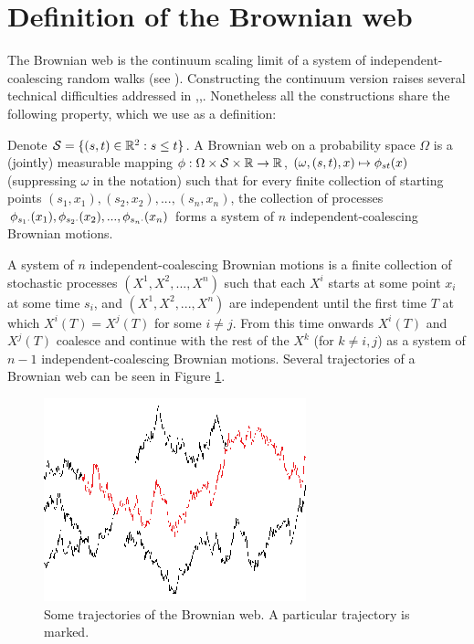 {
\section{Definition of the Brownian web}
\label{sec:brownian-web-definition}

The Brownian web is the continuum scaling limit of a system of
independent-coalescing random walks (see
\cite{tsirelson-lecture-course}).  Constructing the
continuum version raises several technical difficulties addressed in
\cite{toth-werner},\cite{fontes-et-al},\cite{norris-turner}.
Nonetheless all the
constructions share the following property, which we use as a
definition:

\newcommand{\simplex}{\mathcal{S}}

  Denote $\simplex=\{(s, t) \in \R^2 : s \le t\}$.
  A Brownian web on a probability space $\Omega$ is a (jointly)
  measurable mapping $\webnoargs : \Omega \cross \simplex \cross \R
  \to \R$, $(\omega, (s, t), x) \mapsto \phi_{{s}{t}}(x)$ (suppressing
  $\omega$ in the notation) such that for every finite collection of
  starting points $(s_1, x_1),(s_2, x_2),...,(s_n, x_n)$, the
  collection of processes $\phi_{{s_1}{\cdot}}(x_1),
  \phi_{{s_2}{\cdot}}(x_2),...,\phi_{{s_n}{\cdot}}(x_n)$
  forms a system of $n$ independent-coalescing Brownian motions.

  \newcommand{\bm}[1]{X^{#1}}

  A system of $n$ independent-coalescing Brownian motions is a finite
  collection of stochastic processes $(\bm{1}, \bm{2},...,\bm{n})$ such that
  each $\bm{i}$ starts at some point $x_i$ at some time $s_i$, and $(\bm{1},
  \bm{2},...,\bm{n})$ are independent until the first time $T$ at which
  $\bm{i}(T)=\bm{j}(T)$ for some $i\neq j$. From this time onwards $\bm{i}(T)$
  and $\bm{j}(T)$ coalesce and continue with the rest of the $\bm{k}$ (for
  $k\neq i,j$) as a system of $n-1$ independent-coalescing Brownian motions.
  Several trajectories of a Brownian web can be seen in Figure
  \ref{fig:bw-trajectories}.

\begin{figure}
   \centering
   \includegraphics[scale=2]{sometraj.eps}
   \caption{Some trajectories of the Brownian web. A particular trajectory is marked.}
  \label{fig:bw-trajectories}
\end{figure}
}
